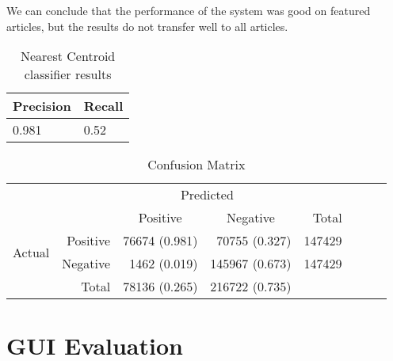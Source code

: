 We can conclude that the performance of the system was good on featured articles, but the results do not transfer well to all articles.

\begin{table}[htbp]
\centering
\begin{tabular}{@{}ll@{}}
\toprule
Precision     & Recall       \\ \midrule
\num{0.981} & \num{0.52} \\
\bottomrule
\end{tabular}
\caption[Nearest Centroid classifier results]{Nearest Centroid classifier results}\label{eval-results}
\end{table}

\begin{table}[htbp]
    \centering
     \begin{tabular}{rrrrrrrr}
      \toprule
      \multicolumn{2}{c}{} & \multicolumn{2}{c}{Predicted} & \\
      \cmidrule{3-4}
      \multicolumn{2}{c}{} & \multicolumn{1}{c}{Positive} & \multicolumn{1}{c}{Negative} & Total \\
      \midrule
      \multirow{2}{*}{Actual} & Positive & \num{76674} (0.981) & \num{70755} (0.327)  & \num{147429} \\
                              & Negative & \num{1462} (0.019)  & \num{145967} (0.673) & \num{147429} \\ \cmidrule{1-2}
                              & Total    & \num{78136} (0.265) & \num{216722} (0.735) \\
      \bottomrule
    \end{tabular}
    \caption[Confusion Matrix]{Confusion Matrix}%
    \label{tab:confusionmatrix}
\end{table}

\section{GUI Evaluation}